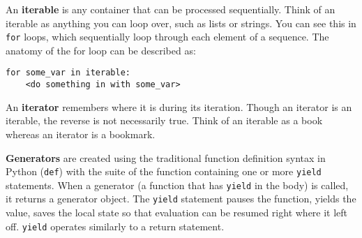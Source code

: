 An \textbf{iterable} is any container that can be processed sequentially. Think of an iterable as anything you can loop over, such as lists or strings.  You can see this in \lstinline{for} loops, which sequentially loop through each element of a sequence. The anatomy of the for loop can be described as:
\begin{lstlisting}
for some_var in iterable:
    <do something in with some_var>
\end{lstlisting}
An \textbf{iterator} remembers where it is during its iteration. Though an iterator is an iterable, the reverse is not necessarily true. Think of an iterable as a book whereas an iterator is a bookmark.

\textbf{Generators} are created using the traditional function definition syntax in Python (\lstinline{def}) with the suite of the function containing one or more \lstinline{yield} statements. When a generator (a function that has \lstinline{yield} in the body) is called, it returns a generator object. The \lstinline{yield} statement pauses the function, yields the value, saves the local state so that evaluation can be resumed right where it left off.  \lstinline{yield} operates similarly to a return statement.